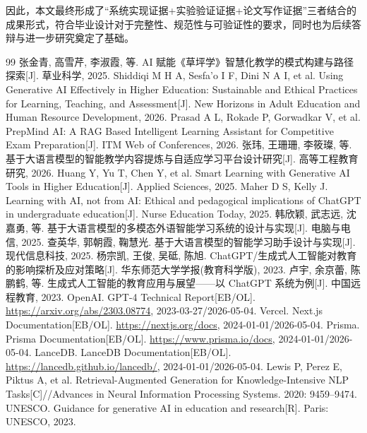 \documentclass[12pt,a4paper,oneside]{ctexbook}
\numberwithin{equation}{chapter}
\begin{document}
因此，本文最终形成了“系统实现证据+实验验证证据+论文写作证据”三者结合的成果形式，符合毕业设计对于完整性、规范性与可验证性的要求，同时也为后续答辩与进一步研究奠定了基础。

\backmatter
\cleardoublepage
{}
\begin{thebibliography}{99}
 张金青, 高雪芹, 李淑霞, 等. AI 赋能《草坪学》智慧化教学的模式构建与路径探索[J]. 草业科学, 2025.
 Shiddiqi M H A, Sesfa'o I F, Dini N A I, et al. Using Generative AI Effectively in Higher Education: Sustainable and Ethical Practices for Learning, Teaching, and Assessment[J]. New Horizons in Adult Education and Human Resource Development, 2026.
 Prasad A L, Rokade P, Gorwadkar V, et al. PrepMind AI: A RAG Based Intelligent Learning Assistant for Competitive Exam Preparation[J]. ITM Web of Conferences, 2026.
 张玮, 王珊珊, 李筱璨, 等. 基于大语言模型的智能教学内容提炼与自适应学习平台设计研究[J]. 高等工程教育研究, 2026.
 Huang Y, Yu T, Chen Y, et al. Smart Learning with Generative AI Tools in Higher Education[J]. Applied Sciences, 2025.
 Maher D S, Kelly J. Learning with AI, not from AI: Ethical and pedagogical implications of ChatGPT in undergraduate education[J]. Nurse Education Today, 2025.
 韩欣颖, 武志远, 沈嘉勇, 等. 基于大语言模型的多模态外语智能学习系统的设计与实现[J]. 电脑与电信, 2025.
 查英华, 郭朝霞, 鞠慧光. 基于大语言模型的智能学习助手设计与实现[J]. 现代信息科技, 2025.
 杨宗凯, 王俊, 吴砥, 陈旭. ChatGPT/生成式人工智能对教育的影响探析及应对策略[J]. 华东师范大学学报(教育科学版), 2023.
 卢宇, 余京蕾, 陈鹏鹤, 等. 生成式人工智能的教育应用与展望——以 ChatGPT 系统为例[J]. 中国远程教育, 2023.
 OpenAI. GPT-4 Technical Report[EB/OL]. \url{https://arxiv.org/abs/2303.08774}, 2023-03-27/2026-05-04.
 Vercel. Next.js Documentation[EB/OL]. \url{https://nextjs.org/docs}, 2024-01-01/2026-05-04.
 Prisma. Prisma Documentation[EB/OL]. \url{https://www.prisma.io/docs}, 2024-01-01/2026-05-04.
 LanceDB. LanceDB Documentation[EB/OL]. \url{https://lancedb.github.io/lancedb/}, 2024-01-01/2026-05-04.
 Lewis P, Perez E, Piktus A, et al. Retrieval-Augmented Generation for Knowledge-Intensive NLP Tasks[C]//Advances in Neural Information Processing Systems. 2020: 9459--9474.
 UNESCO. Guidance for generative AI in education and research[R]. Paris: UNESCO, 2023.
\end{thebibliography}
\end{document}
